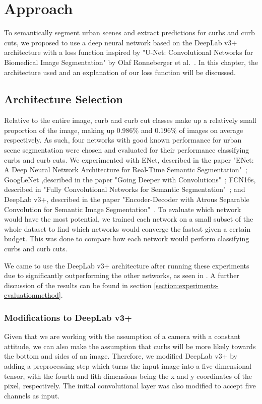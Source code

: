\chapter{Approach}\label{chap:approach}
To semantically segment urban scenes and extract predictions for curbs and curb cuts, we proposed to use a deep neural network based on the DeepLab v3+ architecture with a loss function inspired by "U-Net: Convolutional Networks for Biomedical Image Segmentation" by Olaf Ronneberger et al.~\cite{unet}.
In this chapter, the architecture used and an explanation of our loss function will be discussed.

\section{Architecture Selection} \label{section:approach-architectureselection}
Relative to the entire image, curb and curb cut classes make up a relatively small proportion of the image, making up 0.986\% and 0.196\% of images on average respectively.
As such, four networks with good known performance for urban scene segmentation were chosen and evaluated for their performance classifying curbs and curb cuts.
We experimented with ENet, described in the paper "ENet: A Deep Neural Network Architecture for Real-Time Semantic Segmentation"~\cite{enet}; GoogLeNet ,described in the paper "Going Deeper with Convolutions"~\cite{googlenet}; FCN16s, described in "Fully Convolutional Networks for Semantic Segmentation"~\cite{fcn}; and DeepLab v3+, described in the paper "Encoder-Decoder with Atrous Separable Convolution for Semantic Image Segmentation"~\cite{deeplab}.
To evaluate which network would have the most potential, we trained each network on a small subset of the whole dataset to find which networks would converge the fastest given a certain budget.
This was done to compare how each network would perform classifying curbs and curb cuts.

We came to use the DeepLab v3+ architecture after running these experiments due to significantly outperforming the other networks, as seen in . A further discussion of the results can be found in section \ref{section:experiments-evaluationmethod}.

\subsection{Modifications to DeepLab v3+}\label{section:approach-extendingdeeplab}
Given that we are working with the assumption of a camera with a constant attitude, we can also make the assumption that curbs will be more likely towards the bottom and sides of an image.
Therefore, we modified DeepLab v3+ by adding a preprocessing step which turns the input image into a five-dimensional tensor, with the fourth and fith dimensions being the x and y coordinates of the pixel, respectively.
The initial convolutional layer was also modified to accept five channels as input.

